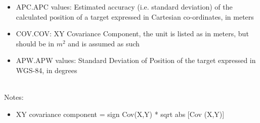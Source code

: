 \begin{itemize}
\item APC.APC values: Estimated accuracy (i.e. standard deviation) of the calculated position of a target expressed in Cartesian co-ordinates, in meters
\item COV.COV: XY Covariance Component, the unit is listed as in meters, but should be in $m^2$ and is assumed as such
\item APW.APW values: Standard Deviation of Position of the target expressed in WGS-84, in degrees
\end{itemize}
\ \\

Notes:
\begin{itemize}
\item XY covariance component = sign {Cov(X,Y)} * sqrt {abs [Cov (X,Y)]}
\end{itemize}
